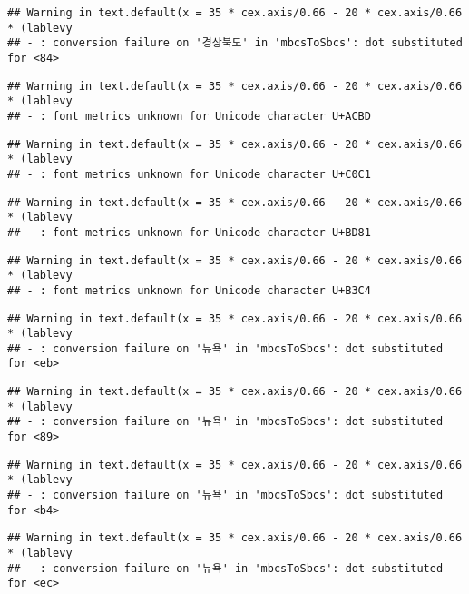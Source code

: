 \documentclass[
]{article}
\begin{document}
\begin{verbatim}
## Warning in text.default(x = 35 * cex.axis/0.66 - 20 * cex.axis/0.66 * (lablevy
## - : conversion failure on '경상북도' in 'mbcsToSbcs': dot substituted for <84>
\end{verbatim}

\begin{verbatim}
## Warning in text.default(x = 35 * cex.axis/0.66 - 20 * cex.axis/0.66 * (lablevy
## - : font metrics unknown for Unicode character U+ACBD
\end{verbatim}

\begin{verbatim}
## Warning in text.default(x = 35 * cex.axis/0.66 - 20 * cex.axis/0.66 * (lablevy
## - : font metrics unknown for Unicode character U+C0C1
\end{verbatim}

\begin{verbatim}
## Warning in text.default(x = 35 * cex.axis/0.66 - 20 * cex.axis/0.66 * (lablevy
## - : font metrics unknown for Unicode character U+BD81
\end{verbatim}

\begin{verbatim}
## Warning in text.default(x = 35 * cex.axis/0.66 - 20 * cex.axis/0.66 * (lablevy
## - : font metrics unknown for Unicode character U+B3C4
\end{verbatim}

\begin{verbatim}
## Warning in text.default(x = 35 * cex.axis/0.66 - 20 * cex.axis/0.66 * (lablevy
## - : conversion failure on '뉴욕' in 'mbcsToSbcs': dot substituted for <eb>
\end{verbatim}

\begin{verbatim}
## Warning in text.default(x = 35 * cex.axis/0.66 - 20 * cex.axis/0.66 * (lablevy
## - : conversion failure on '뉴욕' in 'mbcsToSbcs': dot substituted for <89>
\end{verbatim}

\begin{verbatim}
## Warning in text.default(x = 35 * cex.axis/0.66 - 20 * cex.axis/0.66 * (lablevy
## - : conversion failure on '뉴욕' in 'mbcsToSbcs': dot substituted for <b4>
\end{verbatim}

\begin{verbatim}
## Warning in text.default(x = 35 * cex.axis/0.66 - 20 * cex.axis/0.66 * (lablevy
## - : conversion failure on '뉴욕' in 'mbcsToSbcs': dot substituted for <ec>
\end{verbatim}
\end{document}
